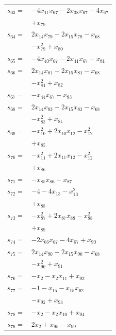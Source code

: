 \begin{longtable}{@{}r@{\;}l@{}}
\(s_{63}=\) & \(\displaystyle -4x_{11}x_{67} -2x_{38}x_{67} -4x_{67}\) \\
 & \(\displaystyle +x_{79}\) \\[3pt]
\(s_{64}=\) & \(\displaystyle 2x_{14}x_{79} -2x_{15}x_{79} -x_{68}\) \\
 & \(\displaystyle -x_{79}^{2} +x_{80}\) \\[3pt]
\(s_{65}=\) & \(\displaystyle -4x_{40}x_{67} -2x_{41}x_{67} +x_{81}\) \\[3pt]
\(s_{66}=\) & \(\displaystyle 2x_{14}x_{81} -2x_{15}x_{81} -x_{68}\) \\
 & \(\displaystyle -x_{81}^{2} +x_{82}\) \\[3pt]
\(s_{67}=\) & \(\displaystyle -x_{44}x_{67} +x_{83}\) \\[3pt]
\(s_{68}=\) & \(\displaystyle 2x_{14}x_{83} -2x_{15}x_{83} -x_{68}\) \\
 & \(\displaystyle -x_{83}^{2} +x_{84}\) \\[3pt]
\(s_{69}=\) & \(\displaystyle -x_{10}^{2} +2x_{10}x_{12} -x_{12}^{2}\) \\
 & \(\displaystyle +x_{85}\) \\[3pt]
\(s_{70}=\) & \(\displaystyle -x_{11}^{2} +2x_{11}x_{12} -x_{12}^{2}\) \\
 & \(\displaystyle +x_{86}\) \\[3pt]
\(s_{71}=\) & \(\displaystyle -x_{85}x_{86} +x_{87}\) \\[3pt]
\(s_{72}=\) & \(\displaystyle -4 -4x_{13} -x_{13}^{2}\) \\
 & \(\displaystyle +x_{88}\) \\[3pt]
\(s_{73}=\) & \(\displaystyle -x_{87}^{2} +2x_{87}x_{88} -x_{88}^{2}\) \\
 & \(\displaystyle +x_{89}\) \\[3pt]
\(s_{74}=\) & \(\displaystyle -2x_{66}x_{67} -4x_{67} +x_{90}\) \\[3pt]
\(s_{75}=\) & \(\displaystyle 2x_{14}x_{90} -2x_{15}x_{90} -x_{68}\) \\
 & \(\displaystyle -x_{90}^{2} +x_{91}\) \\[3pt]
\(s_{76}=\) & \(\displaystyle -x_{2} -x_{2}x_{11} +x_{92}\) \\[3pt]
\(s_{77}=\) & \(\displaystyle -1 -x_{15} -x_{15}x_{92}\) \\
 & \(\displaystyle -x_{92} +x_{93}\) \\[3pt]
\(s_{78}=\) & \(\displaystyle -x_{2} -x_{2}x_{10} +x_{94}\) \\[3pt]
\(s_{79}=\) & \(\displaystyle 2x_{2} +x_{95} -x_{99}\) \\[3pt]

\end{longtable}
